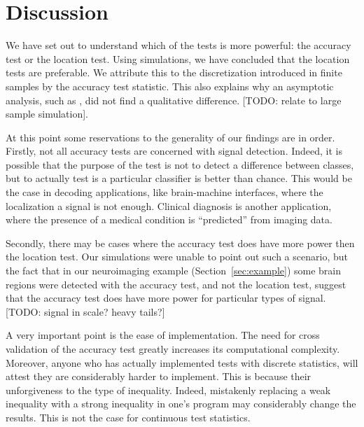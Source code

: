 \documentclass[12pt,a4paper]{article}
\begin{document}
\section{Discussion}
\label{sec:discussion}


We have set out to understand which of the tests is more powerful: the accuracy test or the location test. 
Using simulations, we have concluded that the location tests are preferable. 
We attribute this to the discretization introduced in finite samples by the accuracy test statistic. 
This also explains why an asymptotic analysis, such as \cite{ramdas_classification_2016}, did not find a qualitative difference. [TODO: relate to large sample simulation].

At this point some reservations to the generality of our findings are in order. 
Firstly, not all accuracy tests are concerned with signal detection.
Indeed, it is possible that the purpose of the test is not to detect a difference between classes, but to actually test is a particular classifier is better than chance. 
This would be the case in decoding applications, like brain-machine interfaces, where the localization a signal is not enough. 
Clinical diagnosis is another application, where the presence of a medical condition is ``predicted'' from imaging data. \citep[e.g.][]{olivetti_induction_2012,wager_fmri-based_2013}


Secondly, there may be cases where the accuracy test does have more power then the location test. 
Our simulations were unable to point out such a scenario, but the fact that in our neuroimaging example (Section~\ref{sec:example}) some brain regions were detected with the accuracy test, and not the location test, suggest that the accuracy test does have more power for particular types of signal. 
[TODO: signal in scale? heavy tails?]

A very important point is the ease of implementation. The need for cross validation of the accuracy test greatly increases its computational complexity. 
Moreover, anyone who has actually implemented tests with discrete statistics, will attest they are considerably harder to implement. This is because their unforgiveness to the type of inequality. 
Indeed, mistakenly replacing a weak inequality with a strong inequality in one's program may considerably change the results. 
This is not the case for continuous test statistics. 
\end{document}
